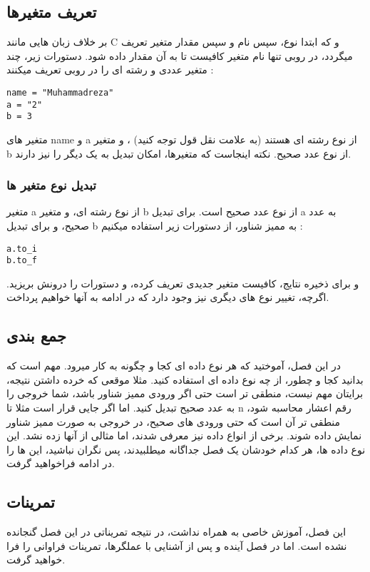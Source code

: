 \documentclass[11pt]{article}
\begin{document}
\subsection{تعریف متغیرها}
بر خلاف زبان هایی مانند C و 
که ابتدا نوع، سپس نام و سپس مقدار متغیر تعریف میگردد، در روبی تنها نام متغیر کافیست تا به آن مقدار داده شود. دستورات زیر، چند متغیر عددی و رشته ای را در روبی تعریف میکنند :
\begin{latin}
\begin{verbatim}
name = "Muhammadreza"
a = "2"
b = 3
\end{verbatim}
\end{latin}
متغیر های name و a از نوع رشته ای هستند (به علامت نقل قول توجه کنید) ، و متغیر b از نوع عدد صحیح. نکته اینجاست که متغیرها، امکان تبدیل به یک دیگر را نیز دارند. 
\subsubsection{تبدیل نوع متغیر ها}
متغیر a از نوع رشته ای، و متغیر b از نوع عدد صحیح است. برای تبدیل a به عدد صحیح، و برای تبدیل b  به ممیز شناور، از دستورات زیر استفاده میکنیم :
\begin{latin}
\begin{verbatim}
a.to_i
b.to_f
\end{verbatim}
\end{latin}
و برای ذخیره نتایج، کافیست متغیر جدیدی تعریف کرده، و دستورات را درونش بریزید. اگرچه، تغییر نوع های دیگری نیز وجود دارد که در ادامه به آنها خواهیم پرداخت. 
\subsection{جمع بندی}
در این فصل، آموختید که هر نوع داده ای کجا و چگونه به کار میرود. مهم است که بدانید کجا و چطور، از چه نوع داده ای استفاده کنید. مثلا موقعی که خرده داشتن نتیجه، برایتان مهم نیست، منطقی تر است حتی اگر ورودی ممیز شناور باشد، شما خروجی را به عدد صحیح تبدیل کنید. اما اگر جایی قرار است مثلا تا n رقم اعشار محاسبه شود، منطقی تر آن است که حتی ورودی های صحیح، در خروجی به صورت ممیز شناور نمایش داده شوند. برخی از انواع داده نیز معرفی شدند، اما مثالی از آنها زده نشد. این نوع داده ها، هر کدام خودشان یک فصل جداگانه میطلبیدند، پس نگران نباشید، این ها را در ادامه فراخواهید گرفت. 
\subsection{تمرینات}
این فصل، آموزش خاصی به همراه نداشت، در نتیجه تمریناتی در این فصل گنجانده نشده است. اما در فصل آینده و پس از آشنایی با عملگرها، تمرینات فراوانی را فرا خواهید گرفت. 
\newpage{}
\end{document}
